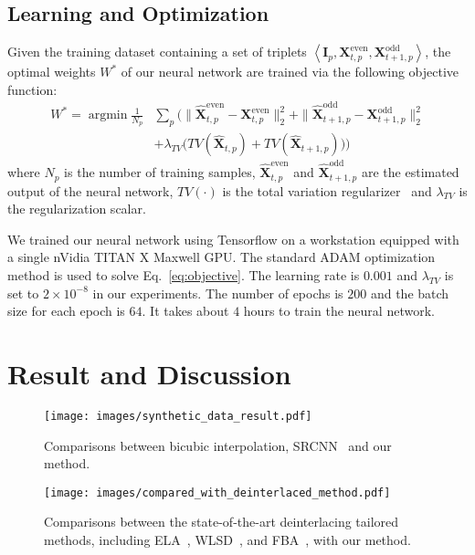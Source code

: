\documentclass[acmtog]{acmart}
\DeclareMathOperator*{\argmin}{\arg\min}
\begin{document}
\subsection{Learning and Optimization}
Given the training dataset containing a set of triplets $\left\langle \mathbf{I}_p,\mathbf{X}^{\text{even}}_{t,p},\mathbf{X}^{\text{odd}}_{t+1,p}\right\rangle$, the optimal weights $W^*$ of our neural network are trained via the following objective function:
\begin{equation}\label{eq:objective}
\begin{split}
W^*=\argmin \frac{1}{N_p} &\sum_p \Big(\|\widehat{\mathbf{X}}^{\text{even}}_{t,p}-\mathbf{X}^{\text{even}}_{t,p}\|^2_2+\|\widehat{\mathbf{X}}^{\text{odd}}_{t+1,p}-\mathbf{X}^{\text{odd}}_{t+1,p}\|^2_2\\
&+\lambda_{TV}\big(TV(\widehat{\mathbf{X}}_{t,p})+TV(\widehat{\mathbf{X}}_{t+1,p})\big)\Big)
\end{split}
\end{equation}
where $N_p$ is the number of training samples, $\widehat{\mathbf{X}}^{\text{even}}_{t,p}$ and $\widehat{\mathbf{X}}^{\text{odd}}_{t+1,p}$ are the estimated output of the neural network, $TV(\cdot)$ is the total variation regularizer~\cite{aly2005image,johnson2016perceptual} and $\lambda_{TV}$ is the regularization scalar.



We trained our neural network using Tensorflow on a workstation equipped with a
single nVidia TITAN X Maxwell GPU. The standard ADAM
optimization method \cite{kingma2014adam} is used to solve
Eq.~\ref{eq:objective}. The learning rate is $0.001$ and $\lambda_{TV}$ is set to
$2\times10^{-8}$ in our experiments. The number of epochs is $200$ and the batch size for each
epoch is $64$. It takes about $4$ hours to train the neural network.
 \section{Result and Discussion}
\begin{figure*}[!tp]
	\centering
\texttt{[image: images/synthetic\_data\_result.pdf]}\\
	\caption{Comparisons between bicubic interpolation, SRCNN~\cite{dong2016image} and our method. 
	}\label{fig:compared_with_bicubic_and_srcnn_results}
\end{figure*}

\begin{figure*}[!tp]
	\centering
\texttt{[image: images/compared\_with\_deinterlaced\_method.pdf]}\\
	\caption{Comparisons between the state-of-the-art deinterlacing tailored methods, including ELA~\cite{doyle1990interlaced}, WLSD~\cite{wang2014interlacing}, and FBA~\cite{vedadi2013interlacing}, with our method. }\label{fig:compared_with_deinterlaced_method}
\end{figure*}
\end{document}

